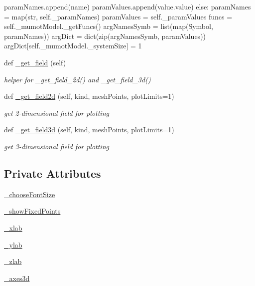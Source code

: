 \begin{DoxyCompactItemize}
\begin{DoxyCompactList}
param\+Names.\+append(name) param\+Values.\+append(value.\+value) else\+: param\+Names = map(str, self.\+\_\+param\+Names) param\+Values = self.\+\_\+param\+Values funcs = self.\+\_\+mumot\+Model.\+\_\+get\+Funcs() arg\+Names\+Symb = list(map(\+Symbol, param\+Names)) arg\+Dict = dict(zip(arg\+Names\+Symb, param\+Values)) arg\+Dict\mbox{[}self.\+\_\+mumot\+Model.\+\_\+system\+Size\mbox{]} = 1 \end{DoxyCompactList}\item 
def \hyperlink{class_mu_mo_t_1_1_mu_mo_t_1_1_mu_mo_tfield_view_aefbf0e354438e17ab6d48e2d368f8540}{\+\_\+get\+\_\+field} (self)
\begin{DoxyCompactList}\small\item\em helper for \+\_\+get\+\_\+field\+\_\+2d() and \+\_\+get\+\_\+field\+\_\+3d() \end{DoxyCompactList}\item 
def \hyperlink{class_mu_mo_t_1_1_mu_mo_t_1_1_mu_mo_tfield_view_afb80cbad7f52c6df0abcb919739ee4de}{\+\_\+get\+\_\+field2d} (self, kind, mesh\+Points, plot\+Limits=1)
\begin{DoxyCompactList}\small\item\em get 2-\/dimensional field for plotting \end{DoxyCompactList}\item 
def \hyperlink{class_mu_mo_t_1_1_mu_mo_t_1_1_mu_mo_tfield_view_a4e3fec079e943d1c0e69b5f7e3f58565}{\+\_\+get\+\_\+field3d} (self, kind, mesh\+Points, plot\+Limits=1)
\begin{DoxyCompactList}\small\item\em get 3-\/dimensional field for plotting \end{DoxyCompactList}\end{DoxyCompactItemize}
\subsection*{Private Attributes}
\begin{DoxyCompactItemize}
\item 
\hyperlink{class_mu_mo_t_1_1_mu_mo_t_1_1_mu_mo_tfield_view_a6a353a1ef9443ae375948d592ed6cec6}{\+\_\+choose\+Font\+Size}
\item 
\hyperlink{class_mu_mo_t_1_1_mu_mo_t_1_1_mu_mo_tfield_view_ac83a924ad62a2461d65b5c9bf9d27453}{\+\_\+show\+Fixed\+Points}
\item 
\hyperlink{class_mu_mo_t_1_1_mu_mo_t_1_1_mu_mo_tfield_view_a865b2109ba10d874e84d4a354873b121}{\+\_\+xlab}
\item 
\hyperlink{class_mu_mo_t_1_1_mu_mo_t_1_1_mu_mo_tfield_view_aac1a25a634d53e524573f67eb5f3a7b9}{\+\_\+ylab}
\item 
\hyperlink{class_mu_mo_t_1_1_mu_mo_t_1_1_mu_mo_tfield_view_afcc07605f40039b605802f93b39ea910}{\+\_\+zlab}
\item 
\hyperlink{class_mu_mo_t_1_1_mu_mo_t_1_1_mu_mo_tfield_view_a506ccaeadc9c6f4102cf4e06f5a6be2a}{\+\_\+axes3d}
\end{DoxyCompactItemize}

